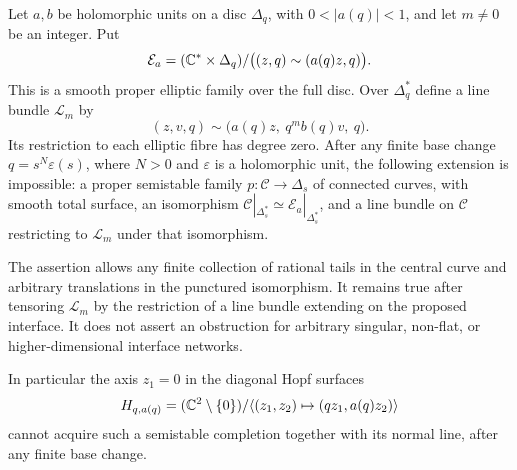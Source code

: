 \begin{proposition}
Let $a,b$ be holomorphic units on a disc $\Delta_q$, with
$0<|a(q)|<1$, and let $m\ne0$ be an integer.  Put
\[
 \mathcal E_a=(\mathbb C^*\times\Delta_q)/
       \bigl((z,q)\sim(a(q)z,q)\bigr).
\]
This is a smooth proper elliptic family over the full disc.
Over $\Delta_q^*$ define a line bundle $\mathcal L_m$ by
\[
 (z,v,q)\sim\bigl(a(q)z,\ q^m b(q)v,\ q\bigr).
\]
Its restriction to each elliptic fibre has degree zero.
After any finite base change $q=s^N\varepsilon(s)$, where
$N>0$ and $\varepsilon$ is a holomorphic unit, the following
extension is impossible: a proper semistable family
$p:\mathcal C\to\Delta_s$ of connected curves, with smooth
total surface, an isomorphism
$\mathcal C|_{\Delta_s^*}\simeq\mathcal E_a|_{\Delta_s^*}$,
and a line bundle on $\mathcal C$ restricting to
$\mathcal L_m$ under that isomorphism.

The assertion allows any finite collection of rational tails
in the central curve and arbitrary translations in the
punctured isomorphism.  It remains true after tensoring
$\mathcal L_m$ by the restriction of a line bundle extending
on the proposed interface.  It does not assert an obstruction
for arbitrary singular, non-flat, or higher-dimensional
interface networks.

In particular the axis $z_1=0$ in the diagonal Hopf surfaces
\[
 H_{q,a(q)}=(\mathbb C^2\setminus\{0\})/
       \langle(z_1,z_2)\mapsto(qz_1,a(q)z_2)\rangle
\]
cannot acquire such a semistable completion together with
its normal line, after any finite base change.
\end{proposition}
